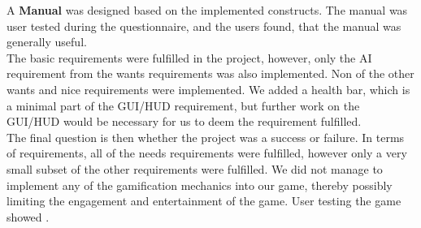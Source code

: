 A \textbf{Manual} was designed based on the implemented constructs.
The manual was user tested during the questionnaire, and the users found, that the manual was generally useful.\\

The basic requirements were fulfilled in the project, however, only the AI requirement from the wants requirements was also implemented.
Non of the other wants and nice requirements were implemented.
We added a health bar, which is a minimal part of the GUI/HUD requirement, but further work on the GUI/HUD would be necessary for us to deem the requirement fulfilled.\\

The final question is then whether the project was a success or failure.
In terms of requirements, all of the needs requirements were fulfilled, however only a very small subset of the other requirements were fulfilled.
We did not manage to implement any of the gamification mechanics into our game, thereby possibly limiting the engagement and entertainment of the game.
User testing the game showed .